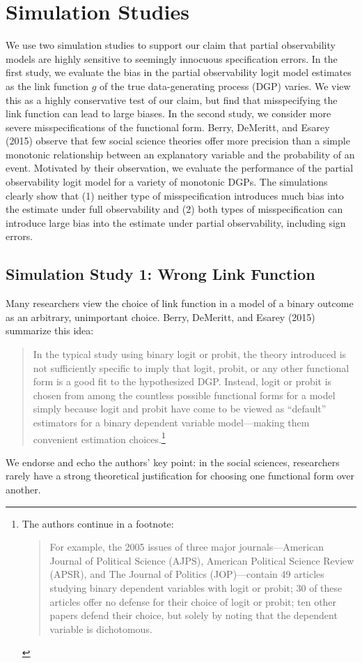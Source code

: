 \documentclass[10pt]{article}
\begin{document}
\section*{Simulation Studies}

We use two simulation studies to support our claim that partial observability models are highly sensitive to seemingly innocuous specification errors. 
In the first study, we evaluate the bias in the partial observability logit model estimates as the link function $g$ of the true data-generating process (DGP) varies. 
We view this as a highly conservative test of our claim, but find that misspecifying the link function can lead to large biases. 
In the second study, we consider more severe misspecifications of the functional form. 
Berry, DeMeritt, and Esarey (2015) observe that few social science theories offer more precision than a simple monotonic relationship between an explanatory variable and the probability of an event. 
Motivated by their observation, we evaluate the performance of the partial observability logit model for a variety of monotonic DGPs.
The simulations clearly show that (1) neither type of misspecification introduces much bias into the estimate under full observability and (2) both types of misspecification can introduce large bias into the estimate under partial observability, including sign errors.

\subsection*{Simulation Study 1: Wrong Link Function}

Many researchers view the choice of link function in a model of a binary outcome as an arbitrary, unimportant choice. 
Berry, DeMeritt, and Esarey (2015) summarize this idea:
\begin{quote}
In the typical study using binary logit or probit, the theory introduced is not sufficiently specific to imply that logit, probit, or any other functional form is a good fit to the hypothesized DGP. 
Instead, logit or probit is chosen from among the countless possible functional forms for a model simply because logit and probit have come to be viewed as ``default'' estimators for a binary dependent variable model---making them convenient estimation choices.\footnote{The authors continue in a footnote:
\begin{quote}
For example, the 2005 issues of three major journals---American Journal of Political Science (AJPS), American Political Science Review (APSR), and The Journal of Politics (JOP)---contain 49 articles studying binary dependent variables with logit or probit; 30 of these articles offer no defense for their choice of logit or probit; ten other papers defend their choice, but solely by noting that the dependent variable is dichotomous. 
\end{quote}}
\end{quote}
We endorse and echo the authors' key point: in the social sciences, researchers rarely have a strong theoretical justification for choosing one functional form over another. 
\end{document}
